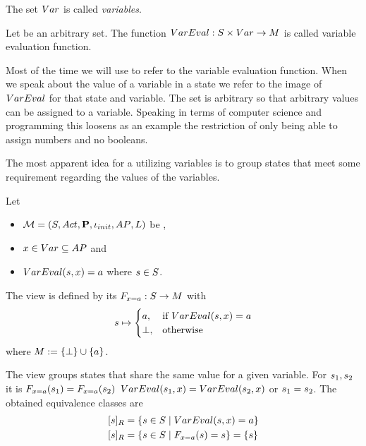 \documentclass[preview]{standalone}
\begin{document}
\begin{definition}
	The set ${Var}$ is called \emph{variables}.
\end{definition}

\begin{definition}
	Let \varevalimg be an arbitrary set. The function ${VarEval} : {S} \times {Var} \to {\ensuremath{{M}}}$ is called variable evaluation function.
\end{definition} 

Most of the time we will use \vareval to refer to the variable evaluation function. When we speak about the value of a variable in a state we refer to the image of ${VarEval}$ for that state and variable. The set \varevalimg is arbitrary so that arbitrary values can be assigned to a variable. Speaking in terms of computer science and programming this loosens as an example the restriction of only being able to assign numbers and no booleans.

The most apparent idea for a \viewN utilizing variables is to group states that meet some requirement regarding the values of the variables.



\begin{definition}
	Let
	\begin{itemize}
		\item ${{{\mathcal{M}}}} = {{({S}, {Act}, {\textbf{P}}, {\iota_{init}}, {AP}, {L})}}$ be \chosengraphtypeN,
		\item ${x} \in {Var} \subseteq {AP}$ and 
		\item ${VarEval}({s}, {x}) = {a}$ where ${s} \in {S}$.		
	\end{itemize} 
	The view \viewparamvalueseq is defined by its \grpfctN ${{F_{{x} = {a}}}} : {S} \to {\ensuremath{{M}}}$ with
	\[
	{s} \mapsto
	\begin{cases}
		{a}, &\text{if } {VarEval}({s}, {x}) = {a}\\
		{\bot}, &\text{otherwise}
	\end{cases}
	\]
	where ${{M}} := {\{\bot\}} \cup \{a\}$.
\end{definition}

The view \viewparamvalueseq groups states that share the same value for a given variable. For ${s}_1, {s}_2$ it is ${{F_{{x} = {a}}}}({s}_1) = {{F_{{x} = {a}}}}({s}_2)$ \iffN ${VarEval}({s}_1, {x}) = {VarEval}({s}_2, {x})$ or ${s}_1 = {s}_2$. The obtained equivalence classes are
\begin{align*}
	{\ensuremath{{[{s}]_{{R}}}}} &= \{{s} \in {S} \mid {VarEval}({s}, {x}) = {a}\} \\
	{{[{s}]_{{R}}}} &= \{{s} \in {S} \mid {\ensuremath{{F_{{x} = {a}}}}}({s}) = {s}\} = \{{s}\}
\end{align*}
\end{document}
